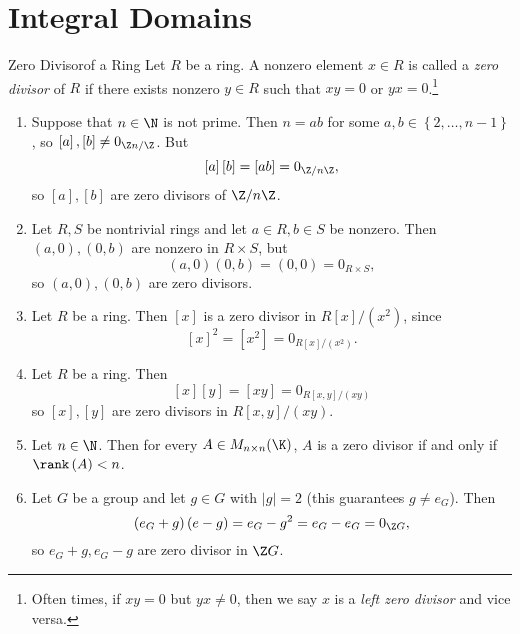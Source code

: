 \documentclass[pmath347]{subfiles}
\begin{document}
    \section{Integral Domains}

    \begin{definition}{Zero Divisor}{of a Ring}
        Let $R$ be a ring. A nonzero element $x\in R$ is called a \emph{zero divisor} of $R$ if there exists nonzero $y\in R$ such that $xy=0$ or $yx=0$.\footnote{Often times, if $xy=0$ but $yx\neq 0$, then we say $x$ is a \emph{left zero divisor} and vice versa.}
    \end{definition}
    
    \begin{enumerate}
        \item Suppose that $n\in\N$ is not prime. Then $n=ab$ for some $a,b\in\left\lbrace 2,\ldots,n-1 \right\rbrace$, so $\left[ a \right] , \left[ b \right] \neq 0_{\Z n /\Z}$. But
            \begin{equation*}
                \left[ a \right] \left[ b \right] = \left[ ab \right] = 0_{\Z /n\Z},
            \end{equation*}
            so $\left[ a \right] , \left[ b \right]$ are zero divisors of $\Z /n\Z$.
        \item Let $R,S$ be nontrivial rings and let $a\in R, b\in S$ be nonzero. Then $\left( a,0 \right) , \left( 0,b \right)$ are nonzero in $R\times S$, but
            \begin{equation*}
                \left( a,0 \right) \left( 0,b \right) = \left( 0,0 \right) = 0_{R\times S},
            \end{equation*}
            so $\left( a,0 \right) , \left( 0,b \right)$ are zero divisors.
        \item Let $R$ be a ring. Then $\left[ x \right]$ is a zero divisor in $R\left[ x \right] / \left( x^{2} \right)$, since
            \begin{equation*}
                \left[ x \right] ^{2} = \left[ x^{2}  \right] = 0_{R\left[ x \right] /\left( x^{2}  \right) }.
            \end{equation*}
        \item Let $R$ be a ring. Then
            \begin{equation*}
                \left[ x \right] \left[ y \right] = \left[ xy \right] = 0_{R\left[ x,y \right] / \left( xy \right) }
            \end{equation*}
            so $\left[ x \right] ,\left[ y \right]$ are zero divisors in $R\left[ x,y \right] / \left( xy \right)$.
        \item Let $n\in\N$. Then for every $A\in M_{n\times n}(\K)$, $A$ is a zero divisor if and only if $\rank\left( A \right) < n$. 
        \item Let $G$ be a group and let $g\in G$ with $\left| g \right| = 2$ (this guarantees $g\neq e_G$). Then
            \begin{equation*}
                \left( e_G+g \right) \left( e-g \right) = e_G-g^{2} = e_G-e_G = 0_{\Z G},
            \end{equation*}
            so $e_G+g, e_G-g$ are zero divisor in $\Z G$.
    \end{enumerate}
\end{document}
